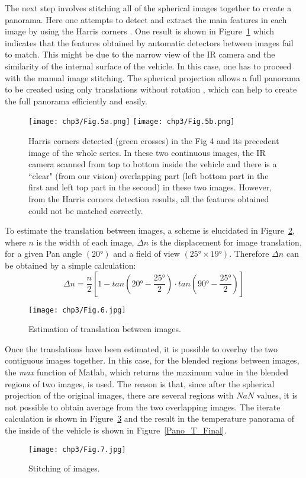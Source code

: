 The next step involves stitching all of the spherical images together to create a panorama. Here one attempts to detect and extract the main features in each image by using the Harris corners \citet{Harris1988}. One result is shown in Figure~\ref{Harris} which indicates that the features obtained by automatic detectors between images fail to match. This might be due to the narrow view of the IR camera and the similarity of the internal surface of the vehicle. In this case, one has to proceed with the manual image stitching.  The spherical projection allows a full panorama to be created using only translations without rotation \citet{Szeliski1997}, which can help to create the full panorama efficiently and easily.
\begin{figure}[ht]
    \texttt{[image: chp3/Fig.5a.png]}
    \texttt{[image: chp3/Fig.5b.png]}
    \caption{Harris corners detected (green crosses) in the Fig 4 and its precedent image of the whole series. In these two continuous images, the IR camera scanned from top to bottom inside the vehicle and there is a ``clear" (from our vision) overlapping part (left bottom part in the first and left top part in the second) in these two images. However, from the Harris corners detection results, all the features obtained could not be matched correctly.}
    \label{Harris}
\end{figure}

To estimate the translation between images, a scheme is elucidated in Figure~\ref{Trans}, where $ n $ is the width of each image, $ \Delta n $ is the displacement for image translation, for a given Pan angle $ (20°) $ and a field of view $ (25° \times 19°) $. Therefore $ \Delta n $ can be obtained by a simple calculation:
\begin{equation}
\Delta n=\dfrac{n}{2}[1-tan(20°-\dfrac{25°}{2})\cdot tan(90°-\dfrac{25°}{2})]
\end{equation}

\begin{figure}[ht]
    \centering
    \texttt{[image: chp3/Fig.6.jpg]}
    \caption{ Estimation of translation between images.}
    \label{Trans}
\end{figure}

Once the translations have been estimated, it is possible to overlay the two contiguous images together. In this case, for the blended regions between images, the \textit{max} function of Matlab, which returns the maximum value in the blended regions of two images, is used. The reason is that, since after the spherical projection of the original images, there are several regions with $ NaN $ values, it is not possible to obtain average from the two overlapping images. The iterate calculation is shown in Figure~\ref{img_sti} and the result in the temperature panorama of the inside of the vehicle is shown in Figure~\ref{Pano_T_Final}.
\begin{figure}[ht]
    \centering
    \texttt{[image: chp3/Fig.7.jpg]}
    \caption{Stitching of images.}
    \label{img_sti}
\end{figure}

